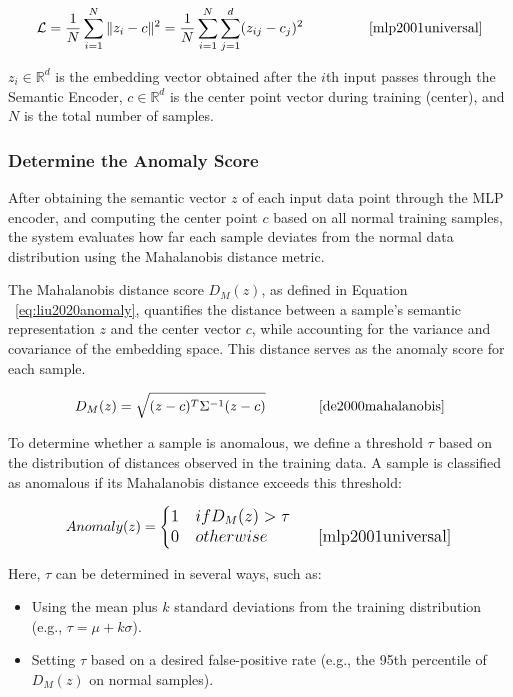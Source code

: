 \begin{ZhChapter}
\begin{equation}
    \mathcal{L} = \frac{1}{N} \sum_{i=1}^{N} \| z_i - c \|^2
    = \frac{1}{N} \sum_{i=1}^{N} \sum_{j=1}^{d} (z_{ij} - c_j)^2 \tag*{\makebox[3.8cm][r]{\cite{mlp2001universal}}}
    \label{eq:centerloss}
\end{equation}

$z_i \in \mathbb{R}^d$ is the embedding vector obtained after the $i$th input passes through the Semantic Encoder,
$c \in \mathbb{R}^d$ is the center point vector during training (center), and $N$ is the total number of samples.



\subsubsection{Determine the Anomaly Score}
After obtaining the semantic vector $z$ of each input data point through the MLP encoder, and computing the center point $c$ based on all normal training samples, the system evaluates how far each sample deviates from the normal data distribution using the Mahalanobis distance metric.

The Mahalanobis distance score $D_M(z)$, as defined in Equation ~\ref{eq:liu2020anomaly}, quantifies the distance between a sample's semantic representation $z$ and the center vector $c$, while accounting for the variance and covariance of the embedding space. This distance serves as the anomaly score for each sample.

\begin{equation}
    D_M(z) = \sqrt{(z - c)^T \Sigma^{-1} (z - c)} \tag*{\makebox[3.8cm][r]{\cite{de2000mahalanobis}}}
\end{equation}

To determine whether a sample is anomalous, we define a threshold $\tau$ based on the distribution of distances observed in the training data. A sample is classified as anomalous if its Mahalanobis distance exceeds this threshold:

\begin{equation}
    \text{Anomaly}(z) =
    \begin{cases}
        1 & \text{if } D_M(z) > \tau                                            \\
        0 & \text{otherwise} \tag*{\makebox[3.8cm][r]{\cite{mlp2001universal}}}
    \end{cases}
\end{equation}

Here, $\tau$ can be determined in several ways, such as:
\begin{itemize}
    \item Using the mean plus $k$ standard deviations from the training distribution (e.g., $\tau = \mu + k\sigma$).
    \item Setting $\tau$ based on a desired false-positive rate (e.g., the 95th percentile of $D_M(z)$ on normal samples).
\end{itemize}


\end{ZhChapter}
